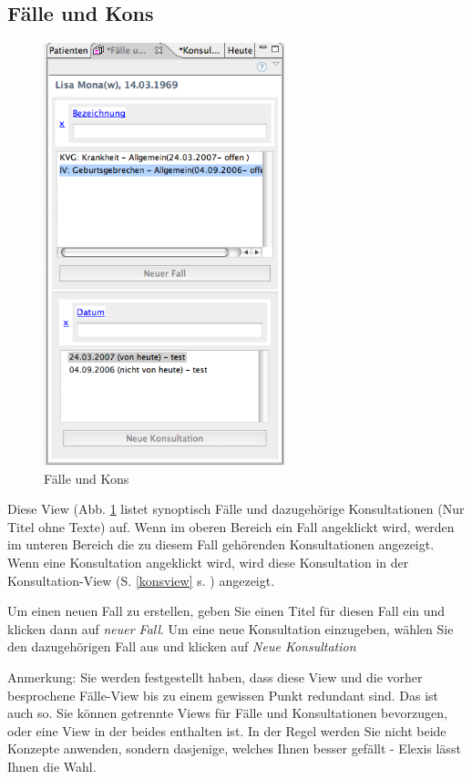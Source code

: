 \subsection{Fälle und Kons}
\begin{figure}
  \includegraphics[width=7cm]{images/fallkonsview}
  \caption{Fälle und Kons}
  \label{fig:fallkons}
\end{figure}
Diese View (Abb. \ref{fig:fallkons} listet synoptisch Fälle und dazugehörige
Konsultationen (Nur Titel ohne Texte) auf. Wenn im oberen Bereich ein Fall
angeklickt wird, werden im unteren Bereich die zu diesem Fall gehörenden
Konsultationen angezeigt. Wenn eine Konsultation angeklickt wird, wird diese
Konsultation in der Konsultation-View (S. \ref{konsview} s. \pageref{konsview}) angezeigt.

Um einen neuen Fall zu erstellen, geben Sie einen Titel für diesen Fall ein und klicken dann auf \textit{neuer Fall}. Um eine neue Konsultation einzugeben, wählen Sie den dazugehörigen Fall aus und klicken auf \textit{Neue Konsultation}

\medskip

Anmerkung: Sie werden festgestellt haben, dass diese View und die vorher besprochene Fälle-View bis zu einem gewissen Punkt redundant sind. Das ist auch so. Sie können getrennte Views für Fälle und Konsultationen bevorzugen, oder eine View in der beides enthalten ist. In der Regel werden Sie nicht beide Konzepte anwenden, sondern dasjenige, welches Ihnen besser gefällt - Elexis lässt Ihnen die Wahl.

